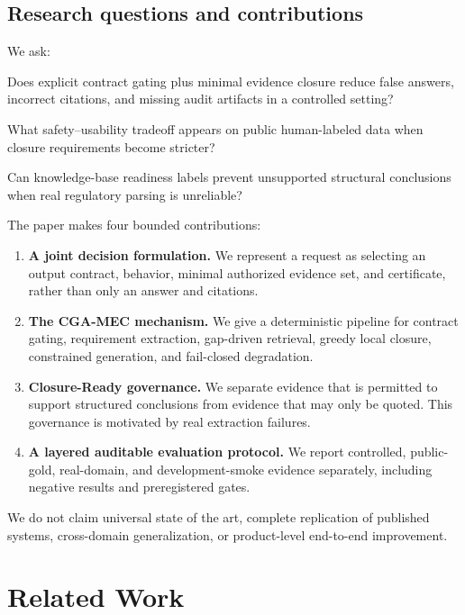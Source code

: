 \documentclass[11pt]{article}
\newcommand{\method}{CGA-MEC}
\begin{document}
\subsection{Research questions and contributions}

We ask:

\begin{description}[leftmargin=1.2em,itemsep=0pt]
  \item[RQ1.] Does explicit contract gating plus minimal evidence closure reduce false answers, incorrect citations, and missing audit artifacts in a controlled setting?
  \item[RQ2.] What safety--usability tradeoff appears on public human-labeled data when closure requirements become stricter?
  \item[RQ3.] Can knowledge-base readiness labels prevent unsupported structural conclusions when real regulatory parsing is unreliable?
\end{description}

The paper makes four bounded contributions:

\begin{enumerate}[leftmargin=*]
  \item \textbf{A joint decision formulation.} We represent a request as selecting an output contract, behavior, minimal authorized evidence set, and certificate, rather than only an answer and citations.
  \item \textbf{The \method{} mechanism.} We give a deterministic pipeline for contract gating, requirement extraction, gap-driven retrieval, greedy local closure, constrained generation, and fail-closed degradation.
  \item \textbf{Closure-Ready governance.} We separate evidence that is permitted to support structured conclusions from evidence that may only be quoted. This governance is motivated by real extraction failures.
  \item \textbf{A layered auditable evaluation protocol.} We report controlled, public-gold, real-domain, and development-smoke evidence separately, including negative results and preregistered gates.
\end{enumerate}

We do not claim universal state of the art, complete replication of published systems, cross-domain generalization, or product-level end-to-end improvement.

\section{Related Work}
\label{sec:related-work}
\end{document}
